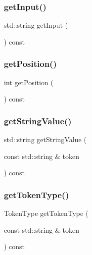 \subsubsection{\texorpdfstring{get\+Input()}{getInput()}}
{\footnotesize\ttfamily std\+::string get\+Input (\begin{DoxyParamCaption}{ }\end{DoxyParamCaption}) const}

\mbox{\label{classTokenScanner_a6c9c9aa34f1ae28cd7a4f150e2df8201}} 
\subsubsection{\texorpdfstring{get\+Position()}{getPosition()}}
{\footnotesize\ttfamily int get\+Position (\begin{DoxyParamCaption}{ }\end{DoxyParamCaption}) const}

\mbox{\label{classTokenScanner_ac9f2b60ecc3007903307c3cb49fd5df1}} 
\subsubsection{\texorpdfstring{get\+String\+Value()}{getStringValue()}}
{\footnotesize\ttfamily std\+::string get\+String\+Value (\begin{DoxyParamCaption}\item[{const std\+::string \&}]{token }\end{DoxyParamCaption}) const}

\mbox{\label{classTokenScanner_a50ed7613c93d2b3618830c3c5a4341ca}} 
\subsubsection{\texorpdfstring{get\+Token\+Type()}{getTokenType()}}
{\footnotesize\ttfamily Token\+Type get\+Token\+Type (\begin{DoxyParamCaption}\item[{const std\+::string \&}]{token }\end{DoxyParamCaption}) const}

